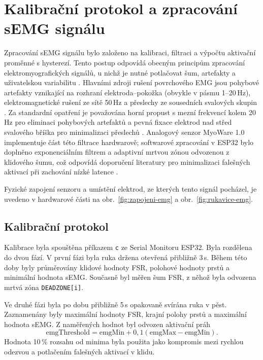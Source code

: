 \documentclass[FZS,DP]{tulthesis}
\begin{document}
\section{Kalibrační protokol a zpracování sEMG signálu}
\label{sec:semg-zpracovani}

Zpracování sEMG signálu bylo založeno na kalibraci, filtraci a výpočtu aktivační proměnné s hysterezí. Tento postup odpovídá obecným principům zpracování elektromyografických signálů, u nichž je nutné potlačovat šum, artefakty a uživatelskou variabilitu \cite{Chowdhury2013917,Reaz2006}. Hlavními zdroji rušení povrchového EMG jsou pohybové artefakty vznikající na rozhraní elektroda--pokožka (obvykle v pásmu 1--20\,Hz), elektromagnetické rušení ze sítě 50\,Hz a přeslechy ze sousedních svalových skupin \cite{Chowdhury2013917,DeLuca2010,Sul2025627}. Za standardní opatření je považována horní propust s mezní frekvencí kolem 20\,Hz pro eliminaci pohybových artefaktů a pevná fixace elektrod nad střed svalového bříška pro minimalizaci přeslechů \cite{Brazdil2020,DeLuca2010,Najman2017}. Analogový senzor MyoWare 1.0 implementuje část této filtrace hardwarově; softwarové zpracování v ESP32 bylo doplněno exponenciálním filtrem a adaptivní mrtvou zónou odvozenou z klidového šumu, což odpovídá doporučení literatury pro minimalizaci falešných aktivací při zachování nízké latence \cite{Safran2022,Reaz2006}.

Fyzické zapojení senzoru a umístění elektrod, ze kterých tento signál pocházel, je uvedeno v hardwarové části na obr.~\ref{fig:zapojeni-emg} a obr.~\ref{fig:rukavice-emg}.

\subsection{Kalibrační protokol}
\label{subsec:kalibracni-protokol}

Kalibrace byla spouštěna příkazem \texttt{c} ze Serial Monitoru ESP32. Byla rozdělena do dvou fází. V první fázi byla ruka držena otevřená přibližně 3\,s. Během této doby byly průměrovány klidové hodnoty FSR, polohové hodnoty prstů a minimální hodnota sEMG\@. Současně byl měřen šum FSR, z něhož byla odvozena mrtvá zóna \texttt{DEADZONE[i]}.

Ve druhé fázi byla po dobu přibližně 5\,s opakovaně svírána ruka v pěst. Zaznamenány byly maximální hodnoty FSR, krajní polohy prstů a maximální hodnota sEMG\@. Z naměřených hodnot byl odvozen aktivační práh
\begin{equation}
    \mathrm{emgThreshold} =
    \mathrm{emgMin} + 0{,}1\left(\mathrm{emgMax} - \mathrm{emgMin}\right).
\end{equation}
Hodnota 10\,\% rozsahu od minima byla použita jako kompromis mezi rychlou odezvou a potlačením falešných aktivací v klidu.
\end{document}
